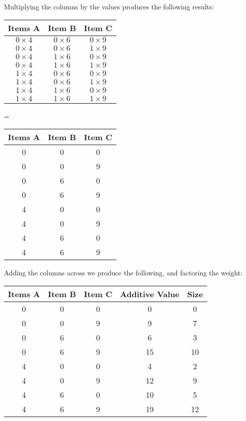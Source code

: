 \documentclass{article}
\begin{document}
Multiplying the columns by the values produces the following results:

\begin{center}

    \begin{tabular}{|c|c|c|}
        \hline
        Items A & Item B & Item C   \\ \hline
        $0 \times 4$ & $0 \times 6$ & $0 \times 9$ \\
        $0 \times 4$ & $0 \times 6$ & $1 \times 9$ \\
        $0 \times 4$ & $1 \times 6$ & $0 \times 9$ \\
        $0 \times 4$ & $1 \times 6$ & $1 \times 9$ \\
        $1 \times 4$ & $0 \times 6$ & $0 \times 9$ \\
        $1 \times 4$ & $0 \times 6$ & $1 \times 9$ \\
        $1 \times 4$ & $1 \times 6$ & $0 \times 9$ \\
        $1 \times 4$ & $1 \times 6$ & $1 \times 9$ \\
        \hline
    \end{tabular} \quad
    = \quad
    \begin{tabular}{|c|c|c|}
        \hline
        Items A & Item B & Item C \\ \hline
        0 & 0 & 0\\
        0 & 0 & 9\\
        0 & 6 & 0\\
        0 & 6 & 9\\
        4 & 0 & 0\\
        4 & 0 & 9\\
        4 & 6 & 0\\
        4 & 6 & 9\\
        \hline
    \end{tabular}
\end{center}

Adding the columns across we produce the following, and factoring the weight:
\begin{center}
    \begin{tabular}{|c|c|c|c|c|}
        \hline
        Items A & Item B & Item C & Additive Value & Size \\ \hline
        0 & 0 & 0 & 0 & 0\\
        0 & 0 & 9 & 9 & 7\\
        0 & 6 & 0 & 6 & 3\\
        0 & 6 & 9 & 15 & 10\\
        4 & 0 & 0 & 4 & 2\\
        4 & 0 & 9 & 12 & 9\\
        4 & 6 & 0 & 10 & 5\\
        4 & 6 & 9 & 19 & 12\\
        \hline
    \end{tabular}
\end{center}
\end{document}
